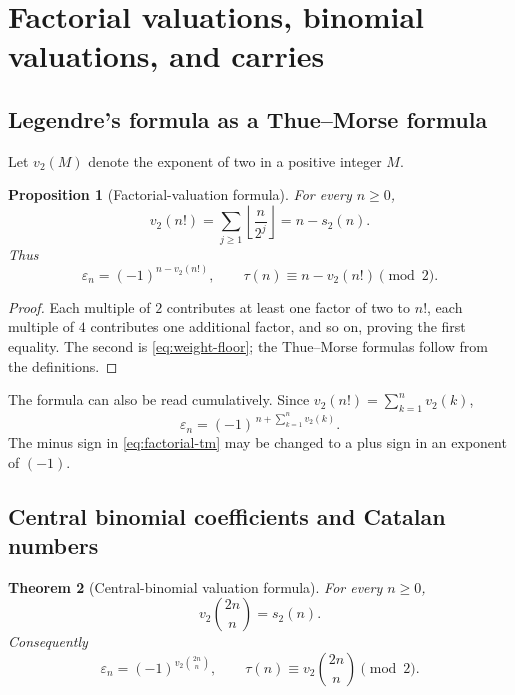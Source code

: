 \documentclass[11pt,oneside]{article}
\newtheorem{theorem}{Theorem}[section]
\newtheorem{proposition}[theorem]{Proposition}
\theoremstyle{definition}
\theoremstyle{remark}
\newcommand{\swt}{s_2}
\newcommand{\vtwo}{v_2}
\newcommand{\eps}{\varepsilon}
\newcommand{\1}{\mathbf 1}
\begin{document}
\section{Factorial valuations, binomial valuations, and carries}
\label{sec:valuations}

\subsection{Legendre's formula as a Thue--Morse formula}

Let \(\vtwo(M)\) denote the exponent of two in a positive integer \(M\).

\begin{proposition}[Factorial-valuation formula]
\label{prop:factorial-valuation}
For every \(n\ge0\),
\begin{equation}
 \vtwo(n!)=\sum_{j\ge1}\left\lfloor\frac n{2^j}\right\rfloor=n-\swt(n).
 \label{eq:legendre2}
\end{equation}
Thus
\begin{equation}
 \boxed{
 \eps_n=(-1)^{n-\vtwo(n!)},
 \qquad
 \tau(n)\equiv n-\vtwo(n!)\pmod2.}
 \label{eq:factorial-tm}
\end{equation}
\end{proposition}

\begin{proof}
Each multiple of \(2\) contributes at least one factor of two to \(n!\), each multiple of
\(4\) contributes one additional factor, and so on, proving the first equality.  The second
is \eqref{eq:weight-floor}; the Thue--Morse formulas follow from the definitions.
\end{proof}

The formula can also be read cumulatively.  Since
\(\vtwo(n!)=\sum_{k=1}^{n}\vtwo(k)\),
\begin{equation}
 \eps_n=(-1)^{\,n+\sum_{k=1}^{n}\vtwo(k)}.
 \label{eq:ruler-cumulative}
\end{equation}
The minus sign in \eqref{eq:factorial-tm} may be changed to a plus sign in an exponent of
\((-1)\).

\subsection{Central binomial coefficients and Catalan numbers}

\begin{theorem}[Central-binomial valuation formula]
\label{thm:central-binomial}
For every \(n\ge0\),
\begin{equation}
 \boxed{\vtwo\binom{2n}{n}=\swt(n)}.
 \label{eq:central-v2}
\end{equation}
Consequently
\begin{equation}
 \boxed{
 \eps_n=(-1)^{\vtwo\binom{2n}{n}},
 \qquad
 \tau(n)\equiv\vtwo\binom{2n}{n}\pmod2.}
 \label{eq:central-tm}
\end{equation}
\end{theorem}
\end{document}
